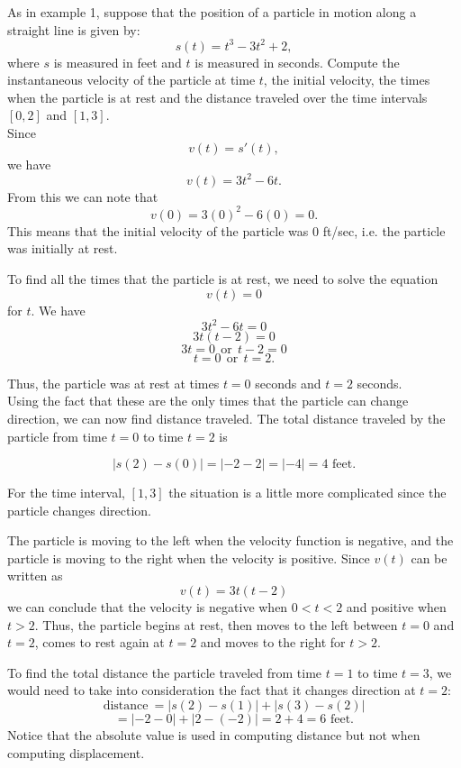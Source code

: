 \documentclass[handout]{ximera}
\begin{document}
 
\begin{example}[example 2] As in example 1, suppose that the position of a particle in motion along a 
straight line is given by:
\[s(t) = t^3 - 3t^2 + 2,\]
where $s$ is measured in feet and $t$ is measured in seconds.
Compute the instantaneous velocity of the particle at time $t$, the initial velocity, the times when the particle 
is at rest and the distance traveled over the time intervals $[0,2]$ and $[1,3]$.\\


Since 
\[v(t) = s'(t),\]
we have
\[v(t) = 3t^2 - 6t.\]
From this we can note that
\[v(0) = 3(0)^2 - 6(0) = 0.\]
This means that the initial velocity of the particle was 0 ft/sec, i.e. the particle was initially at rest.  

To find all the times that the particle is at rest, we need to solve the equation
\[v(t) = 0\]
for $t$.  
We have
\[3t^2 - 6t = 0\]
\[3t(t-2) = 0\]
\[3t = 0 \ \ \text{or} \ \ t-2 = 0\]
\[t = 0 \ \ \text{or} \ \ t = 2.\]

Thus, the particle was at rest at times $t = 0$ seconds and $t = 2$ seconds.\\

Using the fact that these are the only times that the particle can change direction, we can now find distance traveled.
The total distance traveled by the particle from time $t=0$ to time $t=2$ is 

\[|s(2) - s(0)| = |-2 - 2| = |-4| = 4 \text{ feet.}\]

For the time interval, $[1,3]$ the situation is a little more complicated since the particle changes direction.

The particle is moving to the left when the velocity function is negative, and the particle is moving to the right when the 
velocity is positive. Since $v(t)$ can be written as
\[v(t) = 3t(t-2)\]
we can conclude that the velocity is negative when $0<t<2$ and positive when $t>2$.
Thus, the particle begins at rest, then moves to the left between $t = 0$ and $t = 2$, comes to rest again at $t=2$
and moves to the right for $t>2$.

To find the total distance the particle traveled from time $t = 1$ to time $t = 3$, we would need to take into consideration
the fact that it changes direction at $t = 2$:
\[ \text{distance} \  = |s(2) - s(1)| + |s(3) -s(2)|\]
\[= |-2-0|+|2-(-2)| = 2 + 4 = 6  \text{ feet}.\]
Notice that the absolute value is used in computing distance but not when computing displacement.





\end{example}
\end{document}
